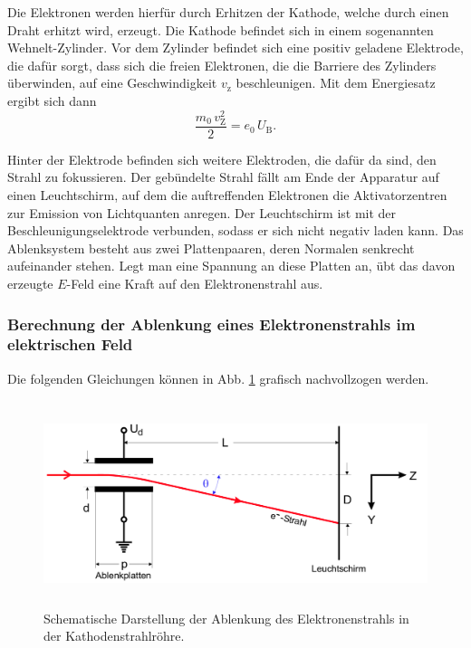 \noindent Die Elektronen werden hierfür durch Erhitzen der Kathode,
welche durch einen Draht erhitzt wird, erzeugt.
Die Kathode befindet sich in einem sogenannten Wehnelt-Zylinder.
Vor dem Zylinder befindet sich eine positiv geladene 
Elektrode, die dafür sorgt, dass sich die freien Elektronen, 
die die Barriere des Zylinders überwinden, auf eine 
Geschwindigkeit $v_\text{z}$ beschleunigen. 
Mit dem Energiesatz ergibt sich dann 
\begin{equation}
    \frac{m_0 \, v_\text{Z}^2}{2} = e_\text{0} \, U_\text{B}.
    \label{eqn:energie}
\end{equation}

\noindent Hinter der Elektrode befinden sich weitere Elektroden, 
die dafür da sind, den Strahl zu fokussieren. Der gebündelte 
Strahl fällt am Ende der Apparatur auf einen Leuchtschirm, 
auf dem die auftreffenden Elektronen die Aktivatorzentren zur 
Emission von Lichtquanten anregen.
Der Leuchtschirm ist mit der Beschleunigungselektrode 
verbunden, sodass er sich nicht negativ laden kann.
Das Ablenksystem besteht aus zwei Plattenpaaren, deren Normalen 
senkrecht aufeinander stehen. Legt man eine Spannung an diese 
Platten an, übt das davon erzeugte $E$-Feld eine Kraft 
auf den Elektronenstrahl aus. 

\subsubsection{Berechnung der Ablenkung eines Elektronenstrahls im elektrischen Feld} %
Die folgenden Gleichungen können in Abb. \ref{fig:roehre2}
grafisch nachvollzogen werden.
\begin{figure}
    \centering
    \includegraphics[width=12cm, height=6cm]{build/roehre2.png}
    \caption{Schematische Darstellung der Ablenkung des
    Elektronenstrahls in der Kathodenstrahlröhre. \cite{V501}}
    \label{fig:roehre2}
\end{figure}

